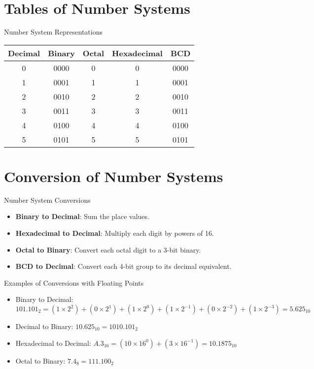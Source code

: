 \documentclass{beamer}
\begin{document}
\section{Tables of Number Systems}
\begin{frame}{Number System Representations}
    \begin{table}[]
        \centering
        \begin{tabular}{|c|c|c|c|c|}
            \hline
            Decimal & Binary & Octal & Hexadecimal & BCD \\
            \hline
            0 & 0000 & 0 & 0 & 0000 \\
            1 & 0001 & 1 & 1 & 0001 \\
            2 & 0010 & 2 & 2 & 0010 \\
            3 & 0011 & 3 & 3 & 0011 \\
            4 & 0100 & 4 & 4 & 0100 \\
            5 & 0101 & 5 & 5 & 0101 \\
            \hline
        \end{tabular}
    \end{table}
\end{frame}

\section{Conversion of Number Systems}
\begin{frame}{Number System Conversions}
    \begin{itemize}
        \item \textbf{Binary to Decimal}: Sum the place values.
        \item \textbf{Hexadecimal to Decimal}: Multiply each digit by powers of 16.
        \item \textbf{Octal to Binary}: Convert each octal digit to a 3-bit binary.
        \item \textbf{BCD to Decimal}: Convert each 4-bit group to its decimal equivalent.
    \end{itemize}
\end{frame}

\begin{frame}{Examples of Conversions with Floating Points}
    \begin{itemize}
        \item Binary to Decimal: $101.101_2 = (1 \times 2^2) + (0 \times 2^1) + (1 \times 2^0) + (1 \times 2^{-1}) + (0 \times 2^{-2}) + (1 \times 2^{-3}) = 5.625_{10}$
        \item Decimal to Binary: $10.625_{10} = 1010.101_2$
        \item Hexadecimal to Decimal: $A.3_{16} = (10 \times 16^0) + (3 \times 16^{-1}) = 10.1875_{10}$
        \item Octal to Binary: $7.4_8 = 111.100_2$
    \end{itemize}
\end{frame}
\end{document}
